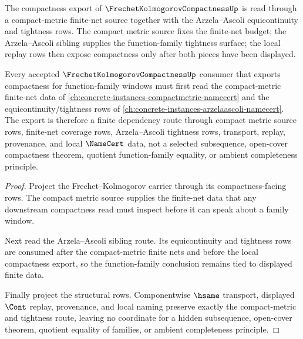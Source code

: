 The compactness export of $\FrechetKolmogorovCompactnessUp$ is read through a compact-metric finite-net source together with the Arzela--Ascoli equicontinuity and tightness rows. The compact metric source fixes the finite-net budget; the Arzela--Ascoli sibling supplies the function-family tightness surface; the local replay rows then expose compactness only after both pieces have been displayed.

\begin{theorem}
\label{thm:frechet-kolmogorov-compactness-tightness-route}
Every accepted $\FrechetKolmogorovCompactnessUp$ consumer that exports compactness for function-family windows must first read the compact-metric finite-net data of \autoref{ch:concrete-instances-compactmetric-namecert} and the equicontinuity/tightness rows of \autoref{ch:concrete-instances-arzelaascoli-namecert}. The export is therefore a finite dependency route through compact metric source rows, finite-net coverage rows, Arzela--Ascoli tightness rows, transport, replay, provenance, and local $\NameCert$ data, not a selected subsequence, open-cover compactness theorem, quotient function-family equality, or ambient completeness principle.
\end{theorem}
\begin{proof}
Project the Frechet--Kolmogorov carrier through its compactness-facing rows. The compact metric source supplies the finite-net data that any downstream compactness read must inspect before it can speak about a family window.

Next read the Arzela--Ascoli sibling route. Its equicontinuity and tightness rows are consumed after the compact-metric finite nets and before the local compactness export, so the function-family conclusion remains tied to displayed finite data.

Finally project the structural rows. Componentwise $\hsame$ transport, displayed $\Cont$ replay, provenance, and local naming preserve exactly the compact-metric and tightness route, leaving no coordinate for a hidden subsequence, open-cover theorem, quotient equality of families, or ambient completeness principle.
\end{proof}
